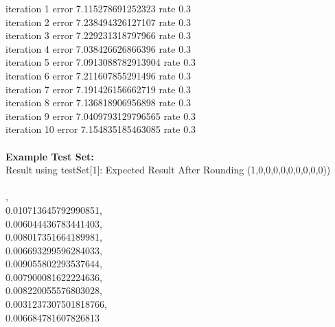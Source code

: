 \documentclass[11pt]{article}
\begin{document}
\begin{page}
\noindent iteration 1 error 7.115278691252323 rate 0.3\\
iteration 2 error 7.238494326127107 rate 0.3\\
iteration 3 error 7.229231318797966 rate 0.3\\
iteration 4 error 7.038426626866396 rate 0.3\\
iteration 5 error 7.0913088782913904 rate 0.3\\
iteration 6 error 7.211607855291496 rate 0.3\\
iteration 7 error 7.191426156662719 rate 0.3\\
iteration 8 error 7.136818906956898 rate 0.3\\
iteration 9 error 7.0409793129796565 rate 0.3\\
iteration 10 error 7.154835185463085 rate 0.3\\\\

\noindent \textbf{Example Test Set:}\\
Result using testSet[1]: Expected Result After Rounding (1,0,0,0,0,0,0,0,0,0))\\\\

,\\
  0.010713645792990851,\\
  0.006044436783441403,\\
  0.008017351664189981,\\
  0.006693299596284033,\\
  0.009055802293537644,\\
  0.007900081622224636,\\
  0.008220055576803028,\\
  0.0031237307501818766,\\
  0.006684781607826813\\
\\


\end{page}
\end{document}
